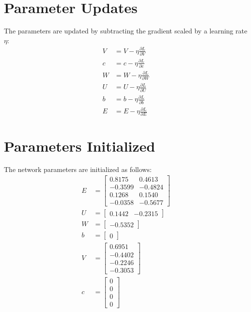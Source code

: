 \documentclass{article}
\begin{document}
\section*{Parameter Updates}

The parameters are updated by subtracting the gradient scaled by a learning rate $\eta$:
\begin{align*}
V &= V - \eta \frac{\partial L}{\partial V}\\
c &= c - \eta \frac{\partial L}{\partial c}\\
W &= W - \eta \frac{\partial L}{\partial W}\\
U &= U - \eta \frac{\partial L}{\partial U}\\
b &= b - \eta \frac{\partial L}{\partial b}\\
E &= E - \eta \frac{\partial L}{\partial E}
\end{align*}

\section{Parameters Initialized}
The network parameters are initialized as follows:
\begin{align*}
E &=
\begin{bmatrix}
  0.8175 & 0.4613 \\
 -0.3599 & -0.4824 \\
  0.1268 & 0.1540 \\
 -0.0358 & -0.5677
\end{bmatrix} \\
U &= \begin{bmatrix}
    0.1442 & -0.2315
\end{bmatrix} \\
W &= \begin{bmatrix}
    -0.5352
\end{bmatrix}\\
b &= \begin{bmatrix}
    0
\end{bmatrix}\\
V &= \begin{bmatrix}
    0.6951 \\
    -0.4402 \\
    -0.2246 \\
    -0.3053
\end{bmatrix}\\
c &= \begin{bmatrix}
    0 \\
    0 \\
    0 \\
    0
\end{bmatrix}
\end{align*}
\newpage
\end{document}
